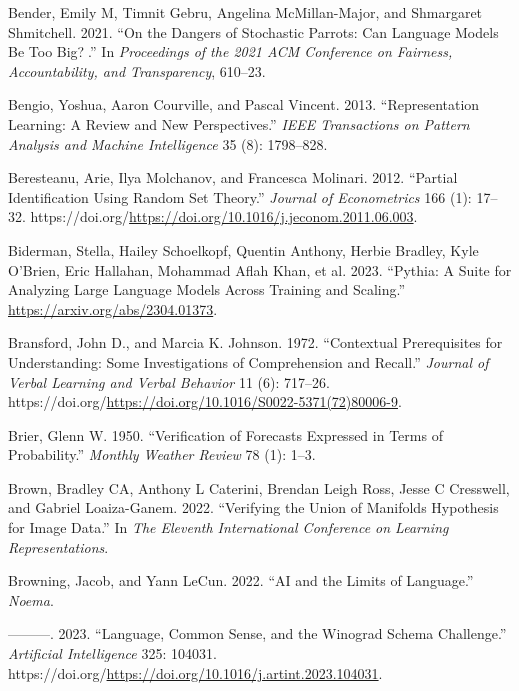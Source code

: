 \documentclass[
]{article}
\newlength{\cslhangindent}
\newenvironment{CSLReferences}[2] %
 {\begin{list}{}{%
  \setlength{\itemindent}{0pt}
  \setlength{\leftmargin}{0pt}
  \setlength{\parsep}{0pt}
  \ifodd #1
   \setlength{\leftmargin}{\cslhangindent}
   \setlength{\itemindent}{-1\cslhangindent}
  \fi
  \setlength{\itemsep}{#2\baselineskip}}}
 {\end{list}}
\begin{document}
\begin{CSLReferences}{1}{0}
Bender, Emily M, Timnit Gebru, Angelina McMillan-Major, and Shmargaret
Shmitchell. 2021. {``On the Dangers of Stochastic Parrots: Can Language
Models Be Too Big?🦜.''} In \emph{Proceedings of the 2021 ACM Conference
on Fairness, Accountability, and Transparency}, 610--23.

Bengio, Yoshua, Aaron Courville, and Pascal Vincent. 2013.
{``Representation Learning: A Review and New Perspectives.''} \emph{IEEE
Transactions on Pattern Analysis and Machine Intelligence} 35 (8):
1798--828.

Beresteanu, Arie, Ilya Molchanov, and Francesca Molinari. 2012.
{``Partial Identification Using Random Set Theory.''} \emph{Journal of
Econometrics} 166 (1): 17--32.
https://doi.org/\url{https://doi.org/10.1016/j.jeconom.2011.06.003}.

Biderman, Stella, Hailey Schoelkopf, Quentin Anthony, Herbie Bradley,
Kyle O'Brien, Eric Hallahan, Mohammad Aflah Khan, et al. 2023.
{``Pythia: A Suite for Analyzing Large Language Models Across Training
and Scaling.''} \url{https://arxiv.org/abs/2304.01373}.

Bransford, John D., and Marcia K. Johnson. 1972. {``Contextual
Prerequisites for Understanding: Some Investigations of Comprehension
and Recall.''} \emph{Journal of Verbal Learning and Verbal Behavior} 11
(6): 717--26.
https://doi.org/\url{https://doi.org/10.1016/S0022-5371(72)80006-9}.

Brier, Glenn W. 1950. {``Verification of Forecasts Expressed in Terms of
Probability.''} \emph{Monthly Weather Review} 78 (1): 1--3.

Brown, Bradley CA, Anthony L Caterini, Brendan Leigh Ross, Jesse C
Cresswell, and Gabriel Loaiza-Ganem. 2022. {``Verifying the Union of
Manifolds Hypothesis for Image Data.''} In \emph{The Eleventh
International Conference on Learning Representations}.

Browning, Jacob, and Yann LeCun. 2022. {``AI and the Limits of
Language.''} \emph{Noema}.

---------. 2023. {``Language, Common Sense, and the Winograd Schema
Challenge.''} \emph{Artificial Intelligence} 325: 104031.
https://doi.org/\url{https://doi.org/10.1016/j.artint.2023.104031}.


\end{CSLReferences}
\end{document}
